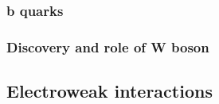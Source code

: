 \subsubsection{b quarks}

\subsubsection{Discovery and role of W boson}


\subsection{Electroweak interactions}

%
%
%
%
%
%
%
%
